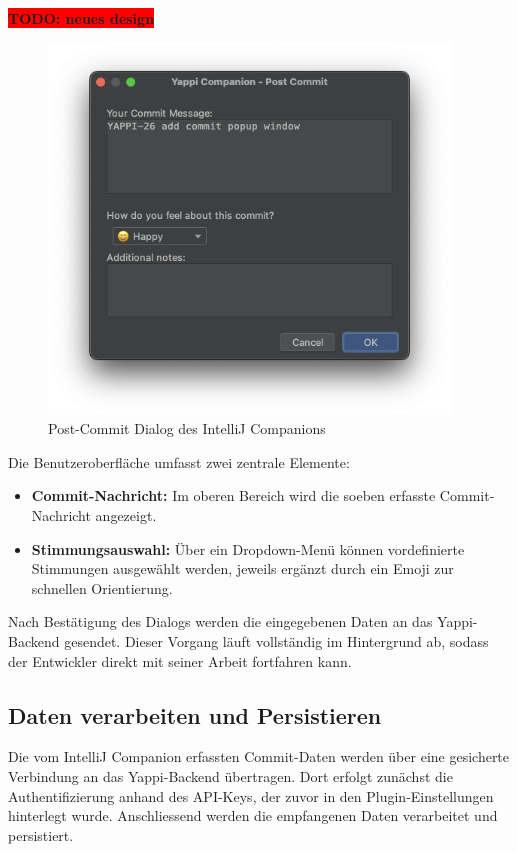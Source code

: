 \documentclass[12pt,a4paper]{report}
\newcommand{\todo}[1]{\colorbox{red}{\textbf{TODO: #1}}\\}
\begin{document}
\todo{neues design}
\begin{figure}[H]
\centering
\includegraphics[width=0.95\textwidth]{../figures/intellij-post-commit.png}
\caption{Post-Commit Dialog des IntelliJ Companions}
\label{fig:intellij-post-commit}
\end{figure}

Die Benutzeroberfläche umfasst zwei zentrale Elemente:

\begin{itemize}
  \item \textbf{Commit-Nachricht:} Im oberen Bereich wird die soeben erfasste Commit-Nachricht angezeigt.
  \item \textbf{Stimmungsauswahl:} Über ein Dropdown-Menü können vordefinierte Stimmungen ausgewählt werden, jeweils ergänzt durch
    ein Emoji zur schnellen Orientierung.
\end{itemize}

Nach Bestätigung des Dialogs werden die eingegebenen Daten an das Yappi-Backend gesendet. Dieser Vorgang läuft vollständig im
Hintergrund ab, sodass der Entwickler direkt mit seiner Arbeit fortfahren kann.

\subsection{Daten verarbeiten und Persistieren}

Die vom IntelliJ Companion erfassten Commit-Daten werden über eine gesicherte Verbindung an das Yappi-Backend übertragen. Dort
erfolgt zunächst die Authentifizierung anhand des API-Keys, der zuvor in den Plugin-Einstellungen hinterlegt wurde. Anschliessend
werden die empfangenen Daten verarbeitet und persistiert.
\end{document}

